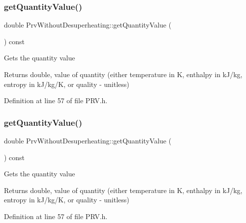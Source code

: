 \subsubsection{\texorpdfstring{get\+Quantity\+Value()}{getQuantityValue()}\hspace{0.1cm}{\footnotesize\ttfamily [1/3]}}
{\footnotesize\ttfamily double Prv\+Without\+Desuperheating\+::get\+Quantity\+Value (\begin{DoxyParamCaption}{ }\end{DoxyParamCaption}) const\hspace{0.3cm}{\ttfamily [inline]}}

Gets the quantity value

\begin{DoxyReturn}{Returns}
double, value of quantity (either temperature in K, enthalpy in k\+J/kg, entropy in k\+J/kg/K, or quality -\/ unitless) 
\end{DoxyReturn}


Definition at line 57 of file P\+R\+V.\+h.

\mbox{\label{class_prv_without_desuperheating_a1113c254f45d08588b0afe4bd1273530}} 
\subsubsection{\texorpdfstring{get\+Quantity\+Value()}{getQuantityValue()}\hspace{0.1cm}{\footnotesize\ttfamily [2/3]}}
{\footnotesize\ttfamily double Prv\+Without\+Desuperheating\+::get\+Quantity\+Value (\begin{DoxyParamCaption}{ }\end{DoxyParamCaption}) const\hspace{0.3cm}{\ttfamily [inline]}}

Gets the quantity value

\begin{DoxyReturn}{Returns}
double, value of quantity (either temperature in K, enthalpy in k\+J/kg, entropy in k\+J/kg/K, or quality -\/ unitless) 
\end{DoxyReturn}


Definition at line 57 of file P\+R\+V.\+h.

\mbox{\label{class_prv_without_desuperheating_a1113c254f45d08588b0afe4bd1273530}} 
